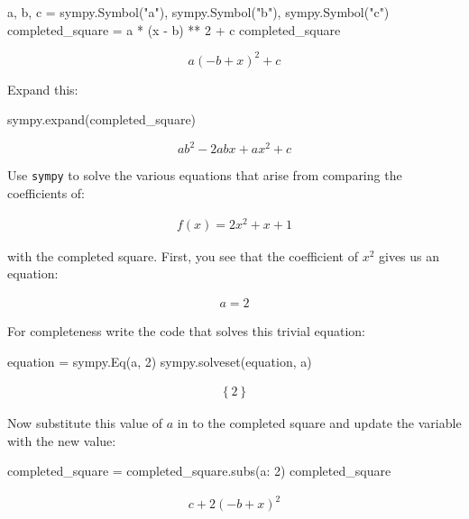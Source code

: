 \begin{pyin}
a, b, c = sympy.Symbol("a"), sympy.Symbol("b"), sympy.Symbol("c")
completed_square = a * (x - b) ** 2 + c
completed_square
\end{pyin}

\[a \left(- b + x\right)^{2} + c\]

Expand this:

\begin{pyin}
sympy.expand(completed_square)
\end{pyin}

\[a b^{2} - 2 a b x + a x^{2} + c\]

Use \texttt{sympy} to solve the various equations that arise from comparing
the coefficients of:

\begin{equation*}
\begin{split}
    f(x) = 2x ^2 + x + 1
\end{split}
\end{equation*}

with the completed square.
First, you see that the coefficient of \(x ^ 2\) gives us an equation:

\begin{equation*}
\begin{split}
    a = 2
\end{split}
\end{equation*}

For completeness write the code that solves this trivial equation:

\begin{pyin}
equation = sympy.Eq(a, 2)
sympy.solveset(equation, a)
\end{pyin}

\begin{equation*}
\begin{split}\displaystyle \left\{2\right\}\end{split}
\end{equation*}

Now substitute this value of \(a\) in to the completed square and update the variable with the new value:

\begin{pyin}
completed_square = completed_square.subs({a: 2})
completed_square
\end{pyin}

\begin{equation*}
\begin{split}\displaystyle c + 2 \left(- b + x\right)^{2}\end{split}
\end{equation*}

